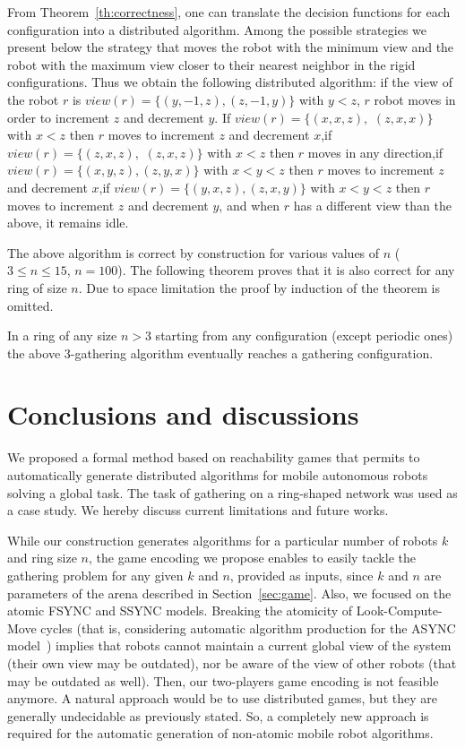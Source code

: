 \documentclass[envcountsame]{llncs} \usepackage[english]{babel}
\begin{document}
From Theorem~\ref{th:correctness}, one can translate the decision functions for each configuration
into a distributed algorithm.
Among the possible strategies we present below the strategy that moves the robot with the minimum view and
the robot with the maximum view closer to their nearest neighbor in the rigid configurations.
Thus we obtain the following distributed algorithm: if the view of the robot $r$ is 
$view(r)=\{(y,-1,z),(z,-1,y)\}$ with $y<z$, $r$ robot moves in order to increment $z$ and decrement $y$. If $view(r)=\{(x,x,z),$ $(z,x,x)\}$ with $x<z$ then $r$ moves to increment $z$ and decrement $x$,if $view(r)=\{(z,x,z),$ $(z,x,z)\}$ with $x<z$ then $r$ moves in any direction,if $view(r)=\{(x,y,z),(z,y,x)\}$ with $x<y<z$ then $r$ moves to increment $z$ and decrement $x$,if $view(r)=\{(y,x,z),(z,x,y)\}$ with $x<y<z$ then $r$ moves to increment $z$ and decrement $y$, and when $r$ has a different view than the above, it remains idle.
  
The above algorithm is correct by construction for various values of $n$ ($3 \leq n  \leq 15$, $n = 100$). 
The following theorem proves that  it is also correct for any ring of size $n$. Due to space limitation the proof by induction of the theorem is omitted. 
\begin{theorem}
In a ring of any size $n>3$ starting from any configuration (except periodic ones) the above 3-gathering algorithm eventually reaches a gathering configuration. 
\end{theorem}

\section{Conclusions and discussions}

We proposed a formal method based on reachability games that permits to automatically generate distributed algorithms for mobile autonomous robots solving a global task. The task of gathering on a ring-shaped network was used as a case study. We hereby discuss current limitations and future works.

While our construction generates algorithms for a particular number of robots $k$ and ring size $n$, the game encoding we propose enables to easily tackle the gathering problem for any given $k$ and $n$, provided as inputs, since $k$ and $n$ are parameters of the arena described in Section~\ref{sec:game}. Also, we focused on the atomic FSYNC and SSYNC models. Breaking the atomicity of Look-Compute-Move cycles (that is, considering automatic algorithm production for the ASYNC model~\cite{FPS12b}) implies that robots cannot maintain a current global view of the system (their own view may be outdated), nor be aware of the view of other robots (that may be outdated as well). Then, our two-players game encoding is not feasible anymore. A natural approach would be to use distributed games, but they are generally undecidable as previously stated. So, a completely new approach is required for the automatic generation of non-atomic mobile robot algorithms.
 
\end{document}
